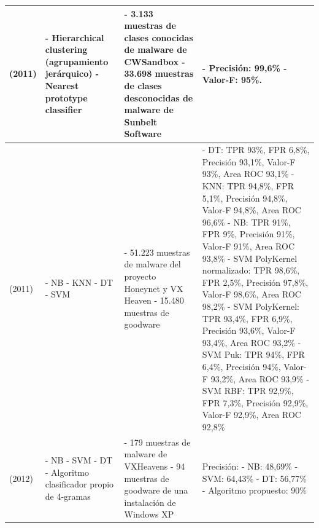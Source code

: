 {\begin{longtable}{|p{}|p{}|p{}|p{}|}
\cite{automatic} (2011)    &
  - Hierarchical clustering (agrupamiento jerárquico) \newline - Nearest prototype classifier &
  - 3.133 muestras de clases conocidas de malware de CWSandbox \newline - 33.698 muestras de clases desconocidas de malware de Sunbelt Software &
  - Precisión: 99,6\% \newline - Valor-F: 95\%. \\ \hline
\cite{zero} (2011)    &
  - \gls{NB} \newline - \gls{KNN} \newline - \gls{DT} \newline - \gls{SVM} &
  - 51.223 muestras de malware del proyecto Honeynet y VX Heaven \newline - 15.480 muestras de goodware &
  - \gls{DT}: \gls{TPR} 93\%, \gls{FPR} 6,8\%, Precisión 93,1\%, Valor-F 93\%, Area \gls{ROC} 93,1\% \newline - \gls{KNN}: \gls{TPR} 94,8\%, \gls{FPR} 5,1\%, Precisión 94,8\%, Valor-F 94,8\%, Area \gls{ROC} 96,6\% \newline - \gls{NB}: \gls{TPR} 91\%, \gls{FPR} 9\%, Precisión 91\%, Valor-F 91\%, Area \gls{ROC} 93,8\% \newline - \gls{SVM} PolyKernel normalizado: \gls{TPR} 98,6\%, \gls{FPR} 2,5\%, Precisión 97,8\%, Valor-F 98,6\%, Area \gls{ROC} 98,2\% \newline - \gls{SVM} PolyKernel: \gls{TPR} 93,4\%, \gls{FPR} 6,9\%, Precisión 93,6\%, Valor-F 93,4\%, Area \gls{ROC} 93,2\% \newline - \gls{SVM} Puk: \gls{TPR} 94\%, \gls{FPR} 6,4\%, Precisión 94\%, Valor-F 93,2\%, Area \gls{ROC} 93,9\% \newline - \gls{SVM} \gls{RBF}: \gls{TPR} 92,9\%, \gls{FPR} 7,3\%, Precisión 92,9\%, Valor-F 92,9\%, Area \gls{ROC} 92,8\% \\ \hline
\cite{ravimalware} (2012)  & 
    - \gls{NB} \newline - \gls{SVM} \newline - \gls{DT} \newline - Algoritmo clasificador propio de 4-gramas & 
    - 179 muestras de malware de VXHeavens \newline - 94 muestras de goodware de una instalación de Windows XP &
    Precisión: \newline - \gls{NB}: 48,69\% \newline - \gls{SVM}: 64,43\% \newline - \gls{DT}: 56,77\% \newline - Algoritmo propuesto: 90\%\\ \hline

\end{longtable}}
